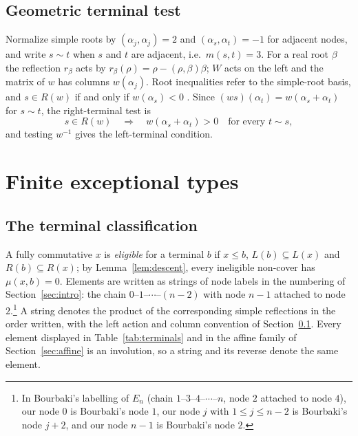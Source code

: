 \documentclass[10pt]{article}
\theoremstyle{remark}
\begin{document}
\subsection{Geometric terminal test}\label{sec:terminaltest}
Normalize simple roots by $(\alpha_j,\alpha_j)=2$ and
$(\alpha_s,\alpha_t)=-1$ for adjacent nodes, and write $s\sim t$ when $s$
and $t$ are adjacent, i.e.\ $m(s,t)=3$. For a real root $\beta$ the
reflection $r_\beta$ acts by $r_\beta(\rho)=\rho-(\rho,\beta)\beta$; $W$
acts on the left and the matrix of $w$ has columns $w(\alpha_j)$. Root
inequalities refer to the simple-root basis, and $s\in R(w)$ if and only
if $w(\alpha_s)<0$ \cite[Proposition~4.4.6]{BB}. Since $(ws)(\alpha_t)=w(\alpha_s+\alpha_t)$ for
$s\sim t$, the right-terminal test is
\begin{equation}\label{eq:terminaltest}
 s\in R(w)\quad\Longrightarrow\quad
 w(\alpha_s+\alpha_t)>0\quad\text{for every }t\sim s,
\end{equation}
and testing $w^{-1}$ gives the left-terminal condition.

\section{Finite exceptional types}\label{sec:finite}
\subsection{The terminal classification}\label{sec:classification}
A fully commutative $x$ is \emph{eligible} for a terminal $b$ if
$x\leq b$, $L(b)\subseteq L(x)$ and $R(b)\subseteq R(x)$; by
Lemma~\ref{lem:descent}, every ineligible non-cover has $\mu(x,b)=0$.
Elements are written as strings of node labels in the numbering of
Section~\ref{sec:intro}: the chain $0\text{--}1\text{--}\cdots\text{--}(n-2)$ with node $n-1$
attached to node~$2$.\footnote{In Bourbaki's labelling of $E_n$ (chain
$1\text{--}3\text{--}4\text{--}\cdots\text{--}n$, node $2$ attached to node $4$), our node $0$ is
Bourbaki's node $1$, our node $j$ with $1\leq j\leq n-2$ is Bourbaki's
node $j+2$, and our node $n-1$ is Bourbaki's node $2$.} A string denotes
the product of the corresponding simple reflections in the order written,
with the left action and column convention of Section~\ref{sec:terminaltest}.
Every element displayed in Table~\ref{tab:terminals} and in the affine
family of Section~\ref{sec:affine} is an involution, so a string and its
reverse denote the same element.
\end{document}
